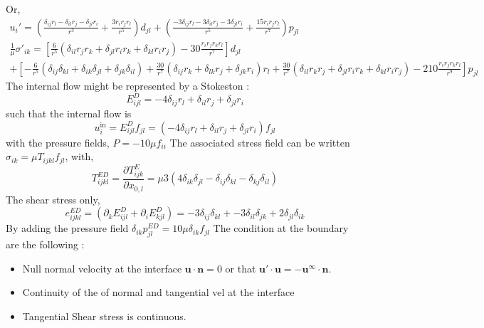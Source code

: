 Or, 
\begin{align*}
    u_i'= 
    \left(
        \frac{\delta_{ij} r_{l} - \delta_{il} r_{j} - \delta_{jl} r_{i}}{r^{3}} 
        + \frac{3 r_{i} r_{j} r_{l}}{r^{5}}
    \right) d_{jl}
    + \left(\frac{- 3 \delta_{ij} r_{l} - 3 \delta_{il} r_{j} - 3 \delta_{jl} r_{i}}{r^{5}} 
    + \frac{15 r_{i} r_{j} r_{l}}{r^{7}}
    \right)p_{jl} \\
    \frac{1}{\mu}\sigma'_{ik}
    = [\frac{6}{r^5}(
        \delta_{il} r_j r_k 
        + \delta_{jl} r_i r_k
        + \delta_{kl}  r_i r_j
    )
    - 30 \frac{r_i r_j r_kr_l}{r^7}] d_{jl}\\
    + [
        -\frac{6}{r^5}(
            \delta_{ij}\delta_{kl}
            + \delta_{ik}\delta_{jl}
            + \delta_{jk} \delta_{il}
        )
        +\frac{30}{r^7}
        (
            \delta_{ij}r_k
            +\delta_{lk} r_j
            +\delta_{jk} r_i
        ) r_l
        +\frac{30}{r^7}
        (
            \delta_{il}r_kr_j
            +\delta_{jl} r_ir_k
            +\delta_{kl} r_i r_j
        ) 
        -210 \frac{r_ir_jr_kr_l}{r^9}
    ]p_{jl}
\end{align*}
The internal flow might be represented by a Stokeston : 
\begin{equation*}
    E^D_{ijl}
    = 
    - 4 \delta_{ij} r_l
    + \delta_{il} r_j 
    + \delta_{jl} r_i
\end{equation*}
such that the internal flow is 
\begin{equation*}
    u_i^\text{in} = E^D_{ijl} f_{jl}
    = 
    (- 4 \delta_{ij} r_l
    + \delta_{il} r_j 
    + \delta_{jl} r_i) f_{jl}
\end{equation*}
with the pressure fields, $P = -10\mu f_{ii}$
The associated stress field can be written $\sigma_{ik} = \mu T_{ijkl} f_{jl}$,
with,
\begin{equation*}
    T^{ED}_{ijkl} 
    =\frac{\partial T^E_{ijk}}{\partial x_{0,l}}
    = \mu 3(4 \delta_{ik} \delta_{jl} - \delta_{ij} \delta_{kl} - \delta_{kj}\delta_{il})
\end{equation*}
The shear stress only, 
\begin{equation*}
    e^{ED}_{ijkl} 
    =  (\partial_k E^D_{ijl} + \partial_i E^D_{kjl})
    = -3 \delta_{ij} \delta_{kl}
    + -3 \delta_{il}\delta_{jk}
    + 2 \delta_{jl} \delta_{ik}
\end{equation*}
By adding the pressure field $\delta_{ik} p_{jl}^{ED} = 10\mu \delta_{ik} f_{jl}$
The condition at the boundary are the following :
\begin{itemize}
    \item Null normal velocity at the interface $\textbf{u}\cdot\textbf{n} = 0$ or that $\textbf{u}'\cdot \textbf{u} = - \textbf{u}^\infty \cdot \textbf{n}$. 
    \item Continuity of the of normal and tangential vel at the interface 
    \item Tangential Shear stress is continuous. 
\end{itemize}
